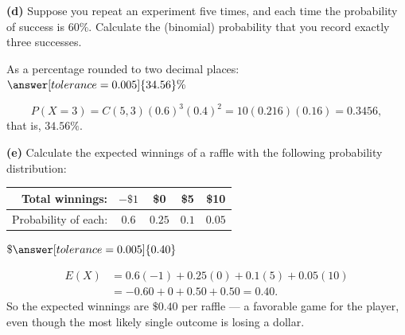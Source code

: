 \documentclass[12pt]{ximera}
\begin{document}
\begin{problem}
\begin{prompt}
\textbf{(d)} Suppose you repeat an experiment five times, and each time the
probability of success is $60\%$. Calculate the (binomial) probability that you record
exactly three successes.

As a percentage rounded to two decimal places: $\answer[tolerance=0.005]{34.56}\%$

\begin{feedback}
\[
P(X=3)=C(5,3)(0.6)^3(0.4)^2 = 10(0.216)(0.16) = 0.3456,
\]
that is, $34.56\%$.
\end{feedback}
\end{prompt}

\begin{prompt}
\textbf{(e)} Calculate the expected winnings of a raffle with the following
probability distribution:

\begin{center}
\begin{tabular}{|r|c|c|c|c|}\hline
Total winnings: & $-\$1$ & \$0 & \$5 & \$10 \\\hline
Probability of each: & $0.6$ & $0.25$ & $0.1$ & $0.05$ \\\hline
\end{tabular}
\end{center}

$\$\answer[tolerance=0.005]{0.40}$

\begin{feedback}
\begin{align*}
E(X) &= 0.6(-1) + 0.25(0) + 0.1(5) + 0.05(10)\\
     &= -0.60 + 0 + 0.50 + 0.50 = 0.40.
\end{align*}
So the expected winnings are $\$0.40$ per raffle --- a favorable game for the player,
even though the most likely single outcome is losing a dollar.
\end{feedback}
\end{prompt}
\end{problem}
\end{document}
